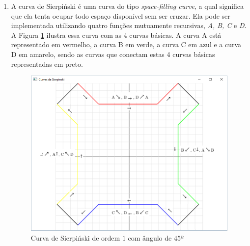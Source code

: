 \begin{enumerate}
  \label{ex:cap04_ex3}

  \newpage

\item
  A curva de Sierpiński é uma curva do tipo \emph{space-filling curve}, a qual significa que ela tenta ocupar todo espaço disponível sem ser cruzar. Ela pode ser implementada utilizando quatro funções mutuamente recursivas, \emph{A, B, C} e \emph{D}. A Figura \ref{fig:cap04_ex16} ilustra essa curva com as 4 curvas básicas. A curva A está representado em vermelho, a curva B em verde, a curva C em azul e a curva D em amarelo, sendo as curvas que conectam estas 4 curvas básicas representadas em preto.

   \begin{figure}[ht]
    \centerline{\includegraphics[width=.5\textwidth]{img/cap4_ex16.png}}
    \caption{Curva de Sierpiński de ordem $1$ com ângulo de $45º$}
    \label{fig:cap04_ex16}
  \end{figure}



\end{enumerate}
